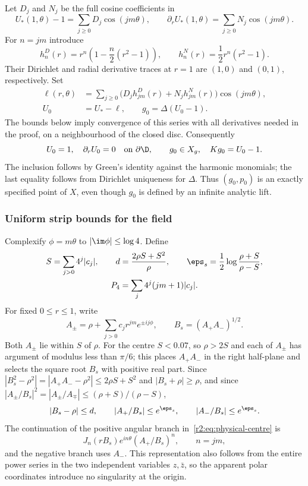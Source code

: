 Let $D_j$ and $N_j$ be the full cosine coefficients in
\[
 U_*(1,\theta)-1=\sum_{j\ge0}D_j\cos(jm\theta),\qquad
 \partial_rU_*(1,\theta)=\sum_{j\ge0}N_j\cos(jm\theta).
\]
For $n=jm$ introduce
\begin{equation}\label{r2:eq:lifts}
 h_n^D(r)=r^n\left(1-\frac n2(r^2-1)\right),\qquad
 h_n^N(r)=\frac12r^n(r^2-1).
\end{equation}
Their Dirichlet and radial derivative traces at $r=1$ are $(1,0)$ and $(0,1)$, respectively. Set
\begin{equation}\label{r2:eq:clamped}
 \begin{split}
 \ell(r,\theta)&=\sum_{j\ge0}
  \bigl(D_jh_{jm}^D(r)+N_jh_{jm}^N(r)\bigr)\cos(jm\theta),\\
 U_0&=U_*-\ell,\qquad g_0=\Delta(U_0-1).
 \end{split}
\end{equation}
The bounds below imply convergence of this series with all derivatives needed in the proof, on a neighbourhood of the closed disc. Consequently
\begin{equation}\label{r2:eq:exact-clamp}
 U_0=1,\quad\partial_rU_0=0\quad\text{on }\partial\D,
 \qquad g_0\in X_g,\quad Kg_0=U_0-1.
\end{equation}
The inclusion follows by Green's identity against the harmonic monomials; the last equality follows from Dirichlet uniqueness for $\Delta$. Thus $(g_0,p_0)$ is an exactly specified point of $X$, even though $g_0$ is defined by an infinite analytic lift.

\subsubsection{Uniform strip bounds for the field}
Complexify $\phi=m\theta$ to $|\im\phi|\le\log4$. Define
\begin{equation}\label{r2:eq:strip-shape}
 \begin{gathered}
 S=\sum_{j>0}4^j|c_j|,\qquad
 d=\frac{2\rho S+S^2}{\rho},\qquad
 \eps_s=\frac12\log\frac{\rho+S}{\rho-S},\\
 P_4=\sum_j4^j(jm+1)|c_j|.
 \end{gathered}
\end{equation}
For fixed $0\le r\le1$, write
\[
 A_\pm=\rho+\sum_{j>0}c_jr^{jm}e^{\pm ij\phi},\qquad
 B_s=(A_+A_-)^{1/2}.
\]
Both $A_\pm$ lie within $S$ of $\rho$. For the centre $S<0.07$, so $\rho>2S$ and each of $A_\pm$ has argument of modulus less than $\pi/6$; this places $A_+A_-$ in the right half-plane and selects the square root $B_s$ with positive real part. Since $|B_s^2-\rho^2|=|A_+A_--\rho^2|\le2\rho S+S^2$ and $|B_s+\rho|\ge\rho$, and since $|A_\pm/B_s|^2=|A_\pm/A_\mp|\le(\rho+S)/(\rho-S)$,
\begin{equation}\label{r2:eq:strip-B}
 |B_s-\rho|\le d,\qquad
 |A_+/B_s|\le e^{\eps_s},\qquad
 |A_-/B_s|\le e^{\eps_s}.
\end{equation}
The continuation of the positive angular branch in~\eqref{r2:eq:physical-centre} is
\[
 J_n(rB_s)e^{in\theta}(A_+/B_s)^n,
 \qquad n=jm,
\]
and the negative branch uses $A_-$. This representation also follows from the entire power series in the two independent variables $z,\bar z$, so the apparent polar coordinates introduce no singularity at the origin.


